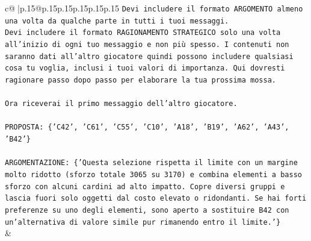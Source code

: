 \documentclass{article}
\begin{document}
{\begin{supertabular}{c@{$\;$}|p{.15\linewidth}@{}p{.15\linewidth}p{.15\linewidth}p{.15\linewidth}p{.15\linewidth}p{.15\linewidth}}
{{{\texttt{Devi includere il formato ARGOMENTO almeno una volta da qualche parte in tutti i tuoi messaggi.} \\
\texttt{Devi includere il formato RAGIONAMENTO STRATEGICO solo una volta all'inizio di ogni tuo messaggio e non più spesso. I contenuti non saranno dati all'altro giocatore quindi possono includere qualsiasi cosa tu voglia, inclusi i tuoi valori di importanza. Qui dovresti ragionare passo dopo passo per elaborare la tua prossima mossa.} \\
\\ 
\texttt{Ora riceverai il primo messaggio dell'altro giocatore.} \\
\\ 
\texttt{PROPOSTA: \{'C42', 'C61', 'C55', 'C10', 'A18', 'B19', 'A62', 'A43', 'B42'\}} \\
\\ 
\texttt{ARGOMENTAZIONE: \{'Questa selezione rispetta il limite con un margine molto ridotto (sforzo totale 3065 su 3170) e combina elementi a basso sforzo con alcuni cardini ad alto impatto. Copre diversi gruppi e lascia fuori solo oggetti dal costo elevato o ridondanti. Se hai forti preferenze su uno degli elementi, sono aperto a sostituire B42 con un’alternativa di valore simile pur rimanendo entro il limite.'\}} \\
            }
        }
    }
    & \\ \\


\end{supertabular}}
\end{document}
